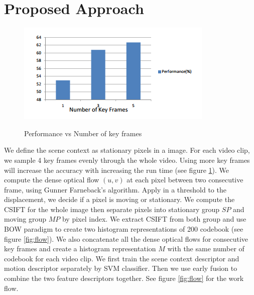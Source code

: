 \documentclass{sig-alternate-05-2015}
\begin{document}
\section{Proposed Approach}\label{sec:method}
\begin{figure}[h]
 \centering
  \includegraphics[scale=0.8]{fig/key_frame.png}
  \caption{Performance vs Number of key frames}
  \label{fig:frames}
  \cite{Reddy:2013:RHA:2508580.2508584}
\end{figure}
We define the scene context as stationary pixels in a image. For each video clip, we sample 4 key frames evenly through the whole video. Using more key frames will increase the accuracy with increasing the run time (see figure \ref{fig:frames}). 
We compute the dense optical flow $(u,v)$ at each pixel between two consecutive frame, using Gunner Farneback's algorithm\cite{Farneback:2003:TME:1763974.1764031}. Apply in a threshold to the displacement, we decide if a pixel is moving or stationary. We compute the CSIFT for the whole image then separate pixels into stationary group $SP$ and moving group $MP$ by pixel index. We extract CSIFT from both group and use BOW paradigm to create two histogram representations of 200 codebook (see figure \ref{fig:flow}). 
We also concatenate all the dense optical flows for consecutive key frames and create a histogram representation $M$ with the same number of codebook for each video clip. We first train the scene context descriptor and motion descriptor separately by SVM classifier\cite{Chang:2011:LLS:1961189.1961199}. Then we use early fusion to combine the two feature descriptors together. See figure \ref{fig:flow} for the work flow. \par 
\end{document}
